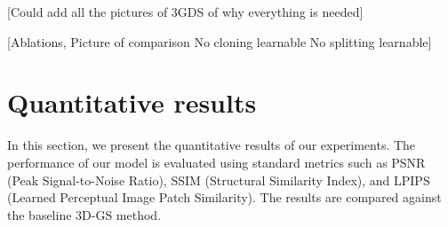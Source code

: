 \documentclass[11pt]{report}
\begin{document}

[Could add all the pictures of 3GDS of why everything is needed]

[Ablations, Picture of comparison
 No cloning learnable
No splitting learnable]

\section{Quantitative results}
In this section, we present the quantitative results of our experiments. The performance of our model is evaluated using standard metrics such as PSNR (Peak Signal-to-Noise Ratio), SSIM (Structural Similarity Index), and LPIPS (Learned Perceptual Image Patch Similarity). The results are compared against the baseline 3D-GS method.

\pgfplotsset{compat=1.17}


\end{document}
